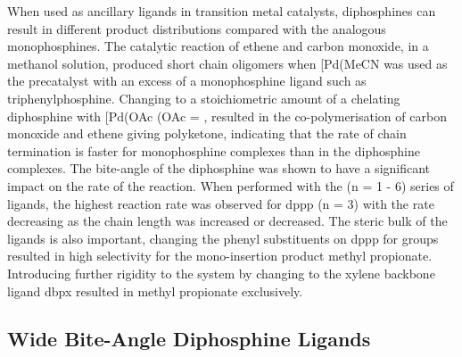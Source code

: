 When used as ancillary ligands in transition metal catalysts, diphosphines can result in different product distributions compared with the analogous monophosphines.  The catalytic reaction of ethene and carbon monoxide, in a methanol solution, produced short chain oligomers when [Pd(MeCN\ce{)4](BF4)2} was used as the precatalyst with an excess of a monophosphine ligand such as triphenylphosphine.\cite{Lai1984}  Changing to a stoichiometric amount of a chelating diphosphine with  [Pd(OAc\ce{)2]} (OAc = , resulted in the co-polymerisation of carbon monoxide and ethene giving polyketone, indicating that the rate of chain termination is faster for mono\-phosphine complexes than in the diphosphine complexes.\cite{Drent1991}  The bite-angle of the di\-phos\-phine was shown to have a significant impact on the rate of the reaction.  When performed with the  (n = 1 - 6) series of ligands, the highest reaction rate was observed for \gls{dppp} (n = 3) with the rate decreasing as the chain length was increased or decreased.\cite{Drent1991}  The steric bulk of the ligands is also important, changing the phenyl substituents on \acrshort{dppp} for \tBu{} groups resulted in high selectivity for the mono-insertion product methyl propionate.\cite{Leeuwenbook2000}  Introducing further rigidity to the system by changing to the xylene backbone ligand \gls{dbpx} resulted in methyl propionate exclusively.\cite{Eastham2000}

\subsection{Wide Bite-Angle Diphosphine Ligands}

